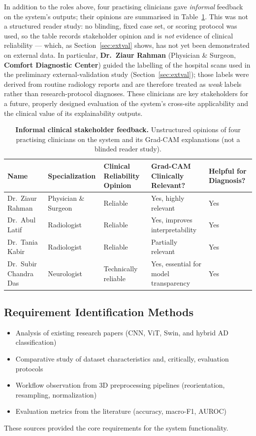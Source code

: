In addition to the roles above, four practising clinicians gave \emph{informal} feedback on the system's outputs; their opinions are summarised in Table~\ref{tab:clin_feedback}. This was not a structured reader study: no blinding, fixed case set, or scoring protocol was used, so the table records stakeholder opinion and is \emph{not} evidence of clinical reliability --- which, as Section~\ref{sec:extval} shows, has not yet been demonstrated on external data. In particular, \textbf{Dr.\ Ziaur Rahman} (Physician \& Surgeon, \textbf{Comfort Diagnostic Center}) guided the labelling of the hospital scans used in the preliminary external-validation study (Section~\ref{sec:extval}); those labels were derived from routine radiology reports and are therefore treated as \emph{weak} labels rather than research-protocol diagnoses. These clinicians are key stakeholders for a future, properly designed evaluation of the system's cross-site applicability and the clinical value of its explainability outputs.

\begin{table}[H]
\centering
\caption{\textbf{Informal clinical stakeholder feedback.} Unstructured opinions of four practising clinicians on the system and its Grad-CAM explanations (not a blinded reader study).}
\label{tab:clin_feedback}
\begin{tabular}{|p{2.8cm}|p{2.6cm}|p{2.5cm}|p{3.2cm}|p{1.7cm}|}
\hline
\textbf{Name} & \textbf{Specialization} & \textbf{Clinical Reliability Opinion} & \textbf{Grad-CAM Clinically Relevant?} & \textbf{Helpful for Diagnosis?} \\
\hline
Dr.\ Ziaur Rahman & Physician \& Surgeon & Reliable & Yes, highly relevant & Yes \\
\hline
Dr.\ Abul Latif & Radiologist & Reliable & Yes, improves interpretability & Yes \\
\hline
Dr.\ Tania Kabir & Radiologist & Reliable & Partially relevant & Yes \\
\hline
Dr.\ Subir Chandra Das & Neurologist & Technically reliable & Yes, essential for model transparency & Yes \\
\hline
\end{tabular}
\end{table}

\subsection{Requirement Identification Methods}
\begin{itemize}
    \item Analysis of existing research papers (CNN, ViT, Swin, and hybrid AD classification)
    \item Comparative study of dataset characteristics and, critically, evaluation protocols
    \item Workflow observation from 3D preprocessing pipelines (reorientation, resampling, normalization)
    \item Evaluation metrics from the literature (accuracy, macro-F1, AUROC)
\end{itemize}
These sources provided the core requirements for the system functionality.

